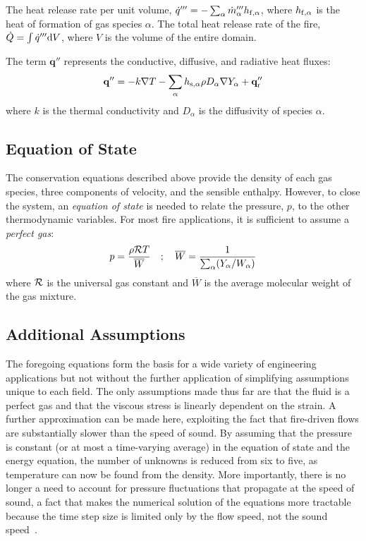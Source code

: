 \documentclass[graybox]{svmult}
\begin{document}
The heat release rate per unit volume, $\dot{q}'''=-\sum_\alpha \dot{m}_\alpha''' h_{{\rm f},\alpha}$, where $h_{{\rm f},\alpha}$ is the heat of formation of gas species $\alpha$. The total heat release rate of the fire, $\dot{Q}=\int \dot{q}'''  {\rm d}V$, where $V$ is the volume of the entire domain.

The term $\mathbf{q}''$ represents the conductive, diffusive, and radiative heat fluxes:
\begin{equation}
   \mathbf{q}'' = -k \nabla T - \sum_\alpha h_{\rm s,\alpha}  \rho  D_\alpha \nabla Y_\alpha + \mathbf{q}_{\rm r}''  \label{bqdot_def}
\end{equation}
where $k$ is the thermal conductivity and $D_\alpha$ is the diffusivity of species $\alpha$.

\subsection{Equation of State}

The conservation equations described above provide the density of each gas species, three components of velocity, and the sensible enthalpy. However, to close the system, an {\em equation of state} is needed to relate the pressure, $p$, to the other thermodynamic variables. For most fire applications, it is sufficient to assume a {\em perfect gas}:
\begin{equation}
p = \frac{\rho {\cal R} T}{\overline{W}} \quad ; \quad \overline{W} = \frac{1}{\sum_\alpha (Y_\alpha / W_\alpha)}
\label{eq:pgas}
\end{equation}
where ${\cal R}$ is the universal gas constant and $\overline{W}$ is the average molecular weight of the gas mixture.


\subsection{Additional Assumptions}

The foregoing equations form the basis for a wide variety of engineering applications but not without the further application of simplifying assumptions unique to each field. The only assumptions made thus far are that the fluid is a perfect gas and that the viscous stress is linearly dependent on the strain. A further approximation can be made here, exploiting the fact that fire-driven flows are substantially slower than the speed of sound. By assuming that the pressure is constant (or at most a time-varying average) in the equation of state and the energy equation, the number of unknowns is reduced from six to five, as temperature can now be found from the density. More importantly, there is no longer a need to account for pressure fluctuations that propagate at the speed of sound, a fact that makes the numerical solution of the equations more tractable because the time step size is limited only by the flow speed, not the sound speed~\cite{Rehm}.
\end{document}
